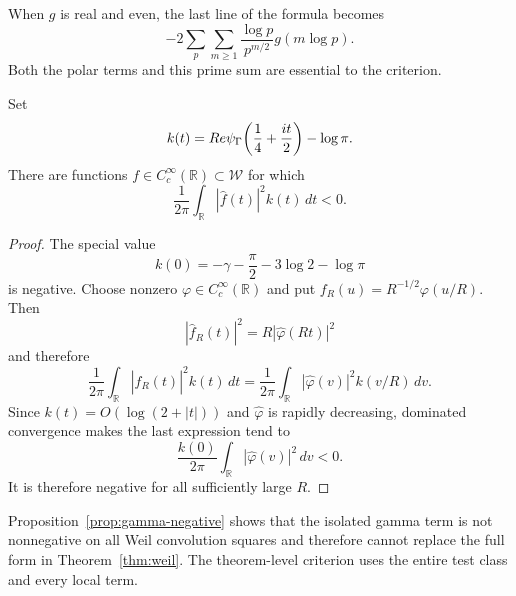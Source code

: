 When \(g\) is real and even, the last line of the formula becomes
\[
 -2\sum_p\sum_{m\geq1}\frac{\log p}{p^{m/2}}g(m\log p).
\]
Both the polar terms and this prime sum are essential to the criterion.

\begin{proposition}
\label{prop:gamma-negative}
Set
\[
 k(t)=Re\psi_{\Gamma}\!\left(\frac14+\frac{it}{2}\right)-\log\pi.
\]
There are functions \(f\in C_c^\infty(\mathbb R)\subset\mathcal W\) for
which
\[
 \frac1{2\pi}\int_{\mathbb R}|\widehat f(t)|^2k(t)\,dt<0.
\]
\end{proposition}

\begin{proof}
The special value
\[
 k(0)=-\gamma-\frac\pi2-3\log2-\log\pi
\]
is negative.  Choose nonzero \(\varphi\in C_c^\infty(\mathbb R)\) and put
\(f_R(u)=R^{-1/2}\varphi(u/R)\).  Then
\[
 |\widehat f_R(t)|^2=R|\widehat\varphi(Rt)|^2
\]
and therefore
\[
 \frac1{2\pi}\int_{\mathbb R}|\widehat f_R(t)|^2k(t)\,dt
 =\frac1{2\pi}\int_{\mathbb R}|\widehat\varphi(v)|^2k(v/R)\,dv.
\]
Since \(k(t)=O(\log(2+|t|))\) and \(\widehat\varphi\) is rapidly
decreasing, dominated convergence makes the last expression tend to
\[
 \frac{k(0)}{2\pi}
 \int_{\mathbb R}|\widehat\varphi(v)|^2\,dv<0.
\]
It is therefore negative for all sufficiently large \(R\).
\end{proof}

Proposition~\ref{prop:gamma-negative} shows that the isolated gamma term is
not nonnegative on all Weil convolution squares and therefore cannot replace
the full form in Theorem~\ref{thm:weil}.  The theorem-level criterion uses
the entire test class and every local term.
